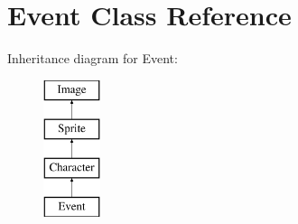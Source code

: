 \hypertarget{classEvent}{\section{Event Class Reference}
\label{classEvent}
}
Inheritance diagram for Event\-:\begin{figure}[H]
\begin{center}
\leavevmode
\includegraphics[height=4.000000cm]{classEvent}
\end{center}
\end{figure}
